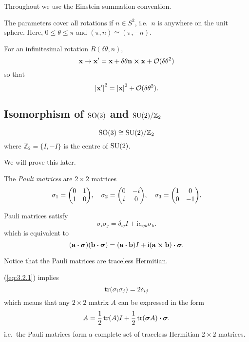 \documentclass[a4paper,11pt]{article}
\begin{document}
	\begin{nt}
		Throughout we use the Einstein summation convention.
	\end{nt}
	
	The parameters cover all rotations if $n \in S^2$, i.e.\ $n$ is anywhere on the unit sphere. Here, $0 \leq \theta \leq \pi$ and $(\pi, n) \simeq (\pi, -n)$.
	
	For an infinitesimal rotation $R(\delta \theta, n)$,
	\[
		\vb x \to \vb x' = \vb x + \delta \theta \vb n \cross \vb x + \mathcal{O}(\delta \theta^2)
	\]
	so that
	\[
		\abs{\vb x '}^2 = \abs{\vb x}^2 + \mathcal{O}(\delta \theta^2).
	\]

	\subsection{Isomorphism of $\operatorname{SO}(3)$ and $\operatorname{SU}(2)/\mathbb{Z}_2$}

	\begin{thm}
		\[
			\operatorname{SO}(3) \cong \operatorname{SU}(2)/ \mathbb{Z}_2
		\]
		where $\mathbb{Z}_2 = \{I , - I\}$ is the centre of $\operatorname{SU}(2)$.
		\label{thm:3.4}
	\end{thm}

	We will prove this later.
	
	\begin{defi}
		The \emph{Pauli matrices} are $2\times 2$ matrices
		\[
			\sigma_1 = \mqty(\pmat{1}), \quad \sigma_2 = \mqty(\pmat{2}), \quad \sigma_3 = \mqty(\pmat{3}).
		\]
	\end{defi}

	\begin{cor}
		Pauli matrices satisfy
		\begin{equation}
			\sigma_i \sigma_j = \delta _{ij} I + \mathrm{i} \epsilon _{ijk} \sigma_k.
			\label{eq:3.2.1}
		\end{equation}
		which is equivalent to
		\[
			(\vb a \vdot \bm \sigma) (\vb b \vdot \bm \sigma) = (\vb a \vdot \vb b) I + \mathrm{i} (\vb a \cross \vb b) \vdot \bm \sigma.
		\]
	\end{cor}

	Notice that the Pauli matrices are traceless Hermitian.

	\begin{lem}
		(\ref{eq:3.2.1}) implies
		\[
			\tr(\sigma_i \sigma_j) = 2 \delta _{ij}
		\]
		which means that any $2 \times 2$ matrix $A$ can be expressed in the form
		\[
			A = \frac{1}{2} \tr (A) I + \frac{1}{2} \tr(\bm \sigma A) \vdot \bm \sigma.
		\]
		i.e.\ the Pauli matrices form a complete set of traceless Hermitian $2\times 2$ matrices.
	\end{lem}
\end{document}
